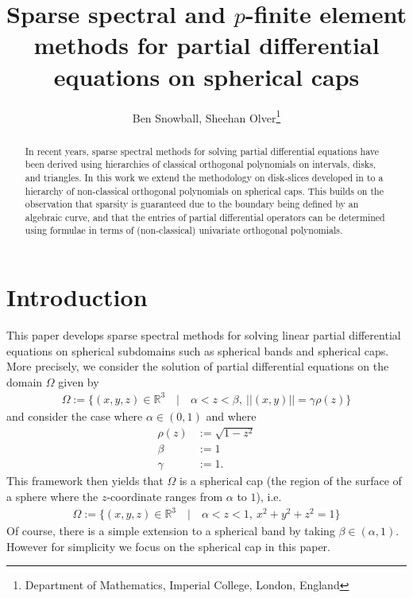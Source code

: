 \documentclass[11pt, oneside]{article}   	%
\title{Sparse spectral and $p$-finite element methods for partial differential equations on spherical caps}
\author{Ben Snowball, Sheehan Olver\thanks{Department of Mathematics, Imperial College, London, England}}
\newcommand{\R}{\mathbb{R}}
\begin{document}
\maketitle

\begin{abstract}
In recent years, sparse spectral methods for solving partial differential equations have been derived using hierarchies of classical orthogonal polynomials on intervals, disks, and triangles. In this work we extend the methodology on disk-slices developed in \cite{snowball2019sparse} to a hierarchy of non-classical orthogonal polynomials on spherical caps. This builds on the observation that sparsity is guaranteed due to the boundary being defined by an algebraic curve, and that the entries of partial differential operators can be determined using formulae in terms of (non-classical) univariate orthogonal polynomials. 
\end{abstract}


%
\section{Introduction}

This paper develops sparse spectral methods for solving linear partial differential equations on spherical subdomains such as spherical bands and spherical caps. More precisely, we consider the solution of partial differential equations on the domain $\Omega$ given by
\begin{align*}
	\Omega := \{(x,y,z) \in \R^3 \quad | \quad \alpha < z < \beta, \: ||(x,y)|| = \gamma \rho(z)\}
\end{align*}
and consider the case where $\alpha \in (0,1)$ and where
\begin{align*}
	 \rho(z) &:= \sqrt{1-z^2} \\
	 \beta &:= 1 \\
	 \gamma &:= 1.
\end{align*}
This framework then yields that $\Omega$ is a spherical cap (the region of the surface of a sphere where the $z$-coordinate ranges from $\alpha$ to $1$), i.e.
\begin{align*}
	\Omega := \{(x,y,z) \in \R^3 \quad | \quad \alpha < z < 1, \: x^2 + y^2 + z^2 = 1\}
\end{align*}
Of course, there is a simple extension to a spherical band by taking $\beta \in (\alpha,1)$. However for simplicity we focus on the spherical cap in this paper.
\end{document}
